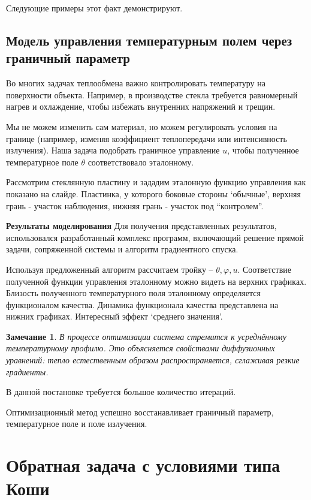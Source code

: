 \documentclass[8pt,a4paper]{article}
\newtheorem*{remark}{Замечание}
\begin{document}
    Следующие примеры этот факт демонстрируют.

    \subsection*{Модель управления температурным полем через граничный параметр}
    Во многих задачах теплообмена важно контролировать температуру на поверхности объекта.
    Например, в производстве стекла требуется равномерный нагрев и охлаждение,
    чтобы избежать внутренних напряжений и трещин.

    Мы не можем изменить сам материал, но можем регулировать условия на границе
    (например, изменяя коэффициент теплопередачи или интенсивность излучения).
    Наша задача подобрать граничное управление $u$,
    чтобы полученное температурное поле $\theta$ соответствовало эталонному.

    Рассмотрим стеклянную пластину и зададим эталонную функцию управления как показано на слайде.
    Пластинка, у которого боковые стороны `обычные', верхняя грань - участок наблюдения,
    нижняя грань - участок под ``контролем''.

    \textbf{Результаты моделирования}
    Для получения представленных результатов, использовался разработанный комплекс программ,
    включающий решение прямой задачи, сопряженной системы и алгоритм градиентного спуска.


    Используя предложенный алгоритм рассчитаем тройку -- $\theta, \varphi, u$.
    Соответствие полученной функции управления эталонному можно видеть на верхних графиках.
    Близость полученного температурного поля эталонному определяется функционалом качества.
    Динамика функционала качества представлена на нижних графиках.
    Интересный эффект `среднего значения'.
    \begin{remark}
        В процессе оптимизации система стремится к усреднённому температурному профилю.
        Это объясняется свойствами диффузионных уравнений: тепло естественным образом распространяется,
        сглаживая резкие градиенты.
    \end{remark}
    В данной постановке требуется большое количество итераций.

    Оптимизационный метод успешно восстанавливает граничный параметр, температурное поле и поле излучения.
    \section*{Обратная задача с условиями типа Коши}
\end{document}
